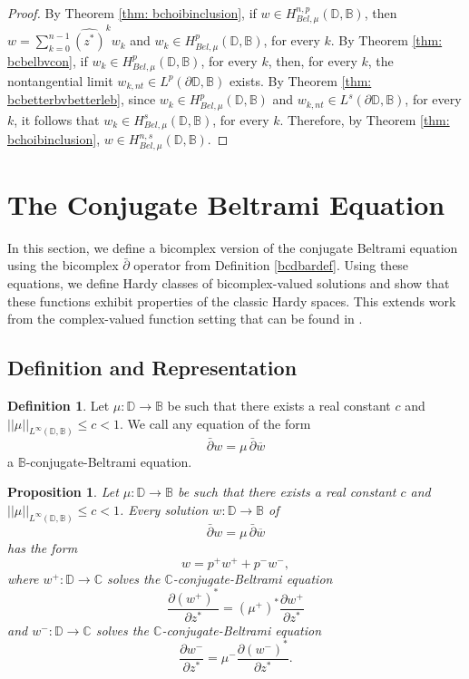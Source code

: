 \documentclass[12pt,reqno]{amsart}
\newtheorem{prop}[theorem]{Proposition}
\theoremstyle{definition}
\newtheorem{deff}[theorem]{Definition}
\theoremstyle{remark}
\newcommand{\p}{\partial}
\newcommand{\dbar}{\bar\partial}
\newcommand{\bc}{\mathbb{B}}
\newcommand{\disk}{\mathbb{D}}
\begin{document}
\begin{proof}
    By Theorem \ref{thm: bchoibinclusion}, if $w \in H^{n,p}_{Bel,\mu}(\disk,\bc)$, then $w = \sum_{k=0}^{n-1} \widehat{ (z^*)}^k w_k$ and $w_k \in H^p_{Bel,\mu}(\disk,\bc)$, for every $k$. By Theorem \ref{thm: bcbelbvcon}, if $w_k \in H^p_{Bel,\mu}(\disk,\bc)$, for every $k$, then, for every $k$, the nontangential limit $w_{k,nt} \in L^p(\p\disk,\bc)$ exists. By Theorem \ref{thm: bcbetterbvbetterleb}, since $w_k \in H^p_{Bel,\mu}(\disk,\bc)$ and $w_{k,nt} \in L^s(\p\disk,\bc)$, for every $k$, it follows that $w_k \in H^s_{Bel,\mu}(\disk,\bc)$, for every $k$. Therefore, by Theorem \ref{thm: bchoibinclusion}, $w \in H^{n,s}_{Bel,\mu}(\disk,\bc)$.
\end{proof}






\section{The Conjugate Beltrami Equation}\label{section: conjbel}

In this section, we define a bicomplex version of the conjugate Beltrami equation using the bicomplex $\dbar$ operator from Definition \ref{bcdbardef}. Using these equations, we define Hardy classes of bicomplex-valued solutions and show that these functions exhibit properties of the classic Hardy spaces. This extends work from the complex-valued function setting that can be found in \cite{PozHardy, CompOp, moreVekHardy, conjbel}.


\subsection{Definition and Representation}

\begin{deff}
    Let $\mu : \disk \to \bc$ be such that there exists a real constant $c$ and $||\mu||_{L^\infty(\disk,\bc)} \leq c < 1$. We call any equation of the form 
    \[
        \dbar w = \mu \, \dbar \overline{w}
    \]
    a $\bc$-conjugate-Beltrami equation. 
\end{deff}

\begin{prop}\label{prop: bcconjbelimpliesconjbbel}
    Let $\mu : \disk \to \bc$ be such that there exists a real constant $c$ and $||\mu||_{L^\infty(\disk,\bc)} \leq c < 1$. Every solution $w:\disk \to\bc$ of 
    \[
        \dbar w = \mu \, \dbar \overline{w}
    \]
    has the form 
    \[
        w = p^+ w^+ + p^- w^-,
    \]
    where $w^+:\disk\to\mathbb{C}$ solves the $\mathbb{C}$-conjugate-Beltrami equation
    \[
        \frac{\p (w^+)^*}{\p z^*} = (\mu^+)^* \frac{\p w^+}{\p z^*}
    \]
    and $w^- : \disk \to \mathbb{C}$ solves the $\mathbb{C}$-conjugate-Beltrami equation
    \[
        \frac{\p w^-}{\p z^*} = \mu^- \frac{\p (w^-)^*}{\p z^*}.
    \]
\end{prop}
\end{document}

